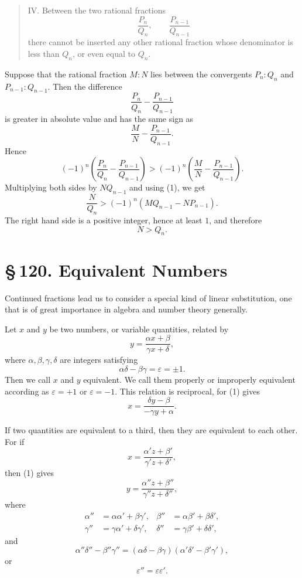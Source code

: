 \documentclass[11pt]{article}
\providecommand{\sect}[2]{\section*{\S\,#1. #2}}
\begin{document}
\begin{quote}
IV. Between the two rational fractions
\[
        \frac{P_n}{Q_n},\qquad \frac{P_{n-1}}{Q_{n-1}}
\]
there cannot be inserted any other rational fraction whose denominator is less than $Q_n$, or even equal to $Q_n$.
\end{quote}

Suppose that the rational fraction $M:N$ lies between the convergents $P_n:Q_n$ and $P_{n-1}:Q_{n-1}$. Then the difference
\[
        \frac{P_n}{Q_n}-\frac{P_{n-1}}{Q_{n-1}}
\]
is greater in absolute value and has the same sign as
\[
        \frac{M}{N}-\frac{P_{n-1}}{Q_{n-1}}.
\]
Hence
\[
        (-1)^n\left(\frac{P_n}{Q_n}-\frac{P_{n-1}}{Q_{n-1}}\right)
        >(-1)^n\left(\frac{M}{N}-\frac{P_{n-1}}{Q_{n-1}}\right).
\]
Multiplying both sides by $NQ_{n-1}$ and using (1), we get
\[
        \frac{N}{Q_n}>(-1)^n(MQ_{n-1}-NP_{n-1}).
\]
The right hand side is a positive integer, hence at least $1$, and therefore
\[
        N>Q_n.
\]

\sect{120}{Equivalent Numbers}

Continued fractions lead us to consider a special kind of linear substitution, one that is of great importance in algebra and number theory generally.

Let $x$ and $y$ be two numbers, or variable quantities, related by
\[
\tag{1}        y=\frac{\alpha x+\beta}{\gamma x+\delta},
\]
where $\alpha,\beta,\gamma,\delta$ are integers satisfying
\[
\tag{2}        \alpha\delta-\beta\gamma=\varepsilon=\pm1.
\]
Then we call $x$ and $y$ equivalent. We call them properly or improperly equivalent according as $\varepsilon=+1$ or $\varepsilon=-1$. This relation is reciprocal, for (1) gives
\[
\tag{3}        x=\frac{\delta y-\beta}{-\gamma y+\alpha}.
\]

If two quantities are equivalent to a third, then they are equivalent to each other. For if
\[
\tag{4}        x=\frac{\alpha' z+\beta'}{\gamma' z+\delta'},
\]
then (1) gives
\[
\tag{5}        y=\frac{\alpha''z+\beta''}{\gamma''z+\delta''},
\]
where
\[
\tag{6}\begin{aligned}
\alpha''&=\alpha\alpha'+\beta\gamma',&
\beta''&=\alpha\beta'+\beta\delta',\\
\gamma''&=\gamma\alpha'+\delta\gamma',&
\delta''&=\gamma\beta'+\delta\delta',
\end{aligned}
\]
and
\[
\tag{7}        \alpha''\delta''-\beta''\gamma''
=(\alpha\delta-\beta\gamma)(\alpha'\delta'-\beta'\gamma'),
\]
or
\[
\tag{8}        \varepsilon''=\varepsilon\varepsilon'.
\]
\end{document}
